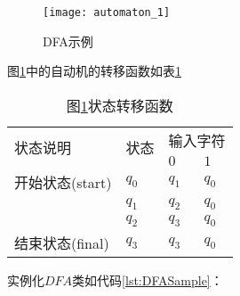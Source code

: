 \begin{figure}[!htbp]
    \centering
    \texttt{[image: automaton\_1]}
    \caption{DFA示例}
    \label{fig:DFA1}
\end{figure}

\newpage
图\ref{fig:DFA1}中的自动机的转移函数如表\ref{tab:DFA1}

\begin{table}[!htbp]
    \caption{图{\ref{fig:DFA1}}状态转移函数}
    \label{tab:DFA1}
    \centering
    \small%
    \setlength{\tabcolsep}{4pt}%
    \renewcommand{\arraystretch}{1.2}%
    \begin{tabular}{l p{3em}<{\centering} p{3em}<{\centering} p{3em}<{\centering}}
        \toprule %
        \multirow{2}{*}{状态说明} & \multirow{2}{*}{状态} & \multicolumn{2}{c}{输入字符} \\
		\cline{3-4}      &    &$0$ & $1$  \\
        \midrule%
        开始状态(start)          & $q_0$ & $q_1$  & $q_0$    \\
                                & $q_1$ & $q_2$  & $q_0$    \\
                                & $q_2$ & $q_3$  & $q_0$    \\
        结束状态(final)         & $q_3$ & $q_3$  & $q_0$    \\
        \bottomrule%
    \end{tabular}
\end{table}

实例化$DFA$类如代码\ref{lst:DFASample}：






